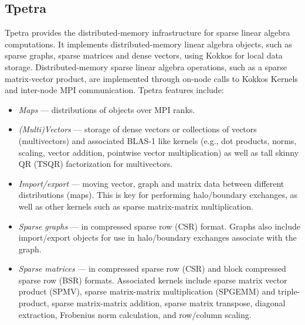 \subsection{Tpetra}\label{subsec:tpetra}
Tpetra \cite{hoemmen2015tpetra} provides the distributed-memory
infrastructure for sparse linear algebra computations.  It implements
distributed-memory linear algebra objects, such as sparse graphs,
sparse matrices and dense vectors, using Kokkos for local data
storage.  Distributed-memory sparse linear algebra operations, such as
a sparse matrix-vector product, are implemented through on-node calls
to Kokkos Kernels and inter-node MPI communication.   Tpetra features
include:
\begin{itemize}
\item \textit{Maps} --- distributions of objects over MPI ranks.
\item \textit{(Multi)Vectors} --- storage of dense vectors or collections of
vectors (multivectors) and associated BLAS-1 like kernels (e.g., dot
products, norms, scaling, vector addition, pointwise vector
multiplication) as well as tall skinny QR (TSQR)  factorization for multivectors.
\item \textit{Import/export} --- moving vector, graph and matrix data
between different distributions (maps).  This is key for performing
halo/boundary exchanges, as well as other kernels such as
sparse matrix-matrix multiplication.
\item \textit{Sparse graphs} --- in compressed sparse row (CSR)
format.  Graphs also include import/export objects for use in
halo/boundary exchanges associate with the graph.
\item \textit{Sparse matrices} --- in compressed sparse row (CSR) and
block compressed sparse row (BSR) formats.  Associated kernels include
sparse matrix vector product (SPMV), sparse matrix-matrix
multiplication (SPGEMM) and triple-product, sparse matrix-matrix addition, sparse matrix transpose, diagonal extraction,
Frobenius norm calculation, and row/column scaling.
\end{itemize}
